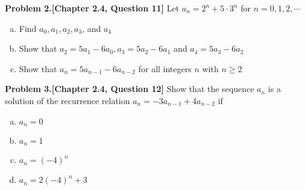 \documentclass[addpoints]{exam}
\begin{document}
\begin{sloppypar}
\begin{questions}
\question
\textbf{Problem 2.[Chapter 2.4, Question 11]}
    Let $a_n = 2^n  + 5 \cdot 3^n $ for $ n = 0,1,2,\cdots$
    \begin{enumerate}[(a)]
        \item Find $a_0,a_1,a_2,a_3$, and $a_4$
        \item Show that $a_2 = 5a_1 - 6a_0, a_3  = 5a_2  - 6a_1$ and $a_4 = 5a_3 - 6a_2$
        \item Show that $a_n = 5a_{n-1} - 6a_{n-2}$ for all integers $n$ with $ n \geq 2$
    \end{enumerate}
\begin{solution}
\end{solution}

\question
\textbf{Problem 3.[Chapter 2.4, Question 12]}
    Show that the sequence ${a_n}$ is a solution of the recurrence relation $a_n = -3a_{n-1} + 4a_{n-2}$ if 
    \begin{enumerate}[(a)]
        \item $a_n = 0 $
        \item $a_n = 1$
        \item $a_n = (-4)^n $
        \item $a_n = 2(-4)^n + 3 $
    \end{enumerate}
\begin{solution}
    \begin{parts}

\end{parts}
\end{solution}
\end{questions}
\end{sloppypar}
\end{document}
